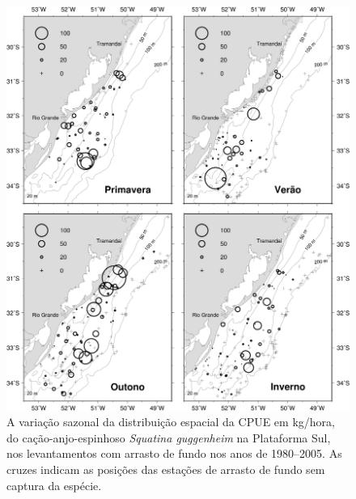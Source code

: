 \documentclass[a4paper,11pt,twoside,showtrims,onecolumn,openright,final]{memoir}
\begin{document}
\begin{figure}
\begin{center}
\includegraphics[width=\textwidth]{GUGGENHEIM_MAPA_DISTRIBUICAO_CPUE}
\end{center}
\caption[Variação sazonal da distribuição espacial da CPUE em kg/hora, do cação-anjo-espinhoso \emph{Squatina guggenheim}]
	{A variação sazonal da distribuição espacial da CPUE em kg/hora, do cação-anjo-espinhoso \emph{Squatina guggenheim} 
	 na Plataforma Sul, nos levantamentos com arrasto de fundo nos anos de 1980--2005. 
	 As cruzes indicam as posições das estações de arrasto de fundo sem captura da espécie.}
\label{fig:guggenheim-mapacpue}
\end{figure}

	  
\end{document}
